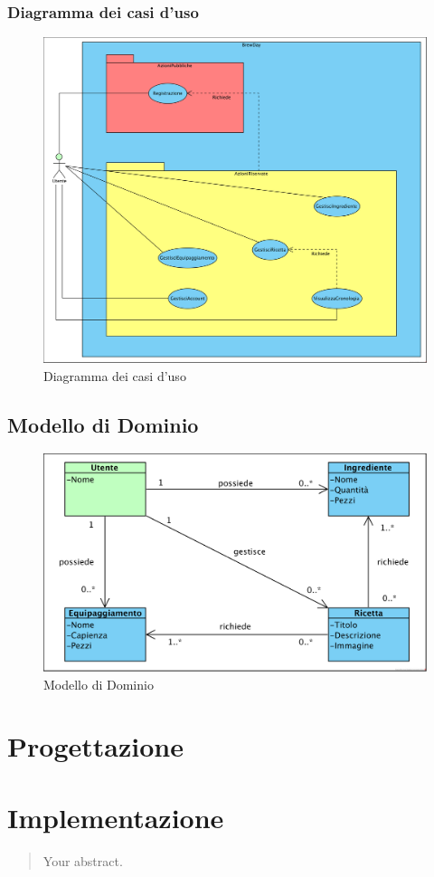 \documentclass[12pt]{article}
\begin{document}
\subsubsection{Diagramma dei casi d'uso}

\begin{figure}[H]
\centering
\includegraphics[width=450px]{diagramma_casi_d_uso.png}
\caption{\label{fig:diagramma_casi_d_uso}Diagramma dei casi d'uso}
\end{figure}


\subsection{Modello di Dominio}

\begin{figure}[H]
\centering
\includegraphics[width=450px]{modello_dominio.png}
\caption{\label{fig:modello_dominio}Modello di Dominio}
\end{figure}



\newpage
\section{Progettazione}

\newpage
\section{Implementazione}


\newpage



\begin{abstract}
Your abstract.
\end{abstract}
\end{document}
